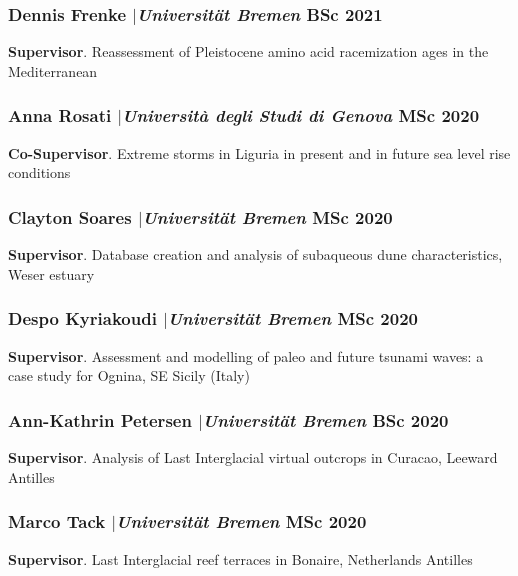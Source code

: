 \documentclass[11pt]{article}
\begin{document}
\subsubsection{Dennis Frenke $|${\normalfont\textit{Universität Bremen}} \hfill BSc 2021}
{\footnotesize 
\textbf{Supervisor}. Reassessment of Pleistocene amino acid racemization ages in the Mediterranean}

\smallskip

\subsubsection{Anna Rosati $|${\normalfont\textit{Università degli Studi di Genova}} \hfill MSc 2020}
{\footnotesize 
\textbf{Co-Supervisor}. Extreme storms in Liguria in present and in future sea level rise conditions}

\smallskip

\subsubsection{Clayton Soares $|${\normalfont\textit{Universität Bremen}} \hfill MSc 2020}
{\footnotesize 
\textbf{Supervisor}. Database creation and analysis of subaqueous dune characteristics, Weser estuary}

\smallskip

\subsubsection{Despo Kyriakoudi $|${\normalfont\textit{Universität Bremen}} \hfill MSc 2020}
{\footnotesize 
\textbf{Supervisor}. Assessment and modelling of paleo and future tsunami waves: a case study for Ognina, SE Sicily (Italy)}

\smallskip

\subsubsection{Ann-Kathrin Petersen $|${\normalfont\textit{Universität Bremen}} \hfill BSc 2020}
{\footnotesize 
\textbf{Supervisor}. Analysis of Last Interglacial virtual outcrops in Curacao, Leeward Antilles}

\smallskip

\subsubsection{Marco Tack $|${\normalfont\textit{Universität Bremen}} \hfill MSc 2020}
{\footnotesize 
\textbf{Supervisor}. Last Interglacial reef terraces in Bonaire, Netherlands Antilles}
\end{document}
